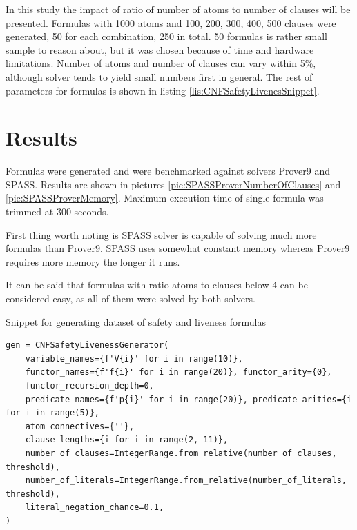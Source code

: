 In this study the impact of ratio of number of atoms to number of clauses will be presented.
Formulas with 1000 atoms and 100, 200, 300, 400, 500 clauses were generated, 50 for each combination, 250 in total. 50 formulas is rather small sample to reason about, but it was chosen because of time and hardware limitations. Number of atoms and number of clauses can vary within 5\%, although solver tends to yield small numbers first in general. The rest of parameters for formulas is shown in listing \ref{lis:CNFSafetyLivenesSnippet}.

\section{Results}

Formulas were generated and were benchmarked against solvers Prover9 and SPASS. Results are shown in pictures \ref{pic:SPASSProverNumberOfClauses} and \ref{pic:SPASSProverMemory}. Maximum execution time of single formula was trimmed at 300 seconds. 

First thing worth noting is SPASS solver is capable of solving much more formulas than Prover9. SPASS uses somewhat constant memory whereas Prover9 requires more memory the longer it runs.

It can be said that formulas with ratio atoms to clauses below 4 can be considered easy, as all of them were solved by both solvers.

\begin{listing}[ht]
  \caption{Snippet for generating dataset of safety and liveness formulas}
  \label{lis:CNFSafetyLivenesSnippet}
\begin{verbatim}
gen = CNFSafetyLivenessGenerator(
    variable_names={f'V{i}' for i in range(10)},
    functor_names={f'f{i}' for i in range(20)}, functor_arity={0},
    functor_recursion_depth=0,
    predicate_names={f'p{i}' for i in range(20)}, predicate_arities={i for i in range(5)},
    atom_connectives={''},
    clause_lengths={i for i in range(2, 11)},
    number_of_clauses=IntegerRange.from_relative(number_of_clauses, threshold),
    number_of_literals=IntegerRange.from_relative(number_of_literals, threshold),
    literal_negation_chance=0.1,
)
\end{verbatim}
\end{listing}

